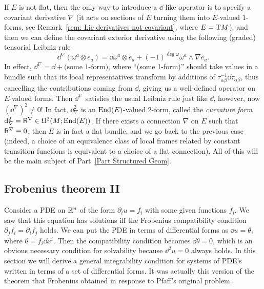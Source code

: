 \begin{rem}
    If $E$ is not flat, then the only way to introduce a $\dd$-like operator is to specify a covariant derivative $\nabla$ (it acts on sections of $E$ turning them into $E$-valued $1$-forms, see Remark~\ref{rem: Lie derivatives not covariant}, where $E=\mathrm{T} M$), and then we can define the covariant exterior derivative using the following (graded) tensorial Leibniz rule
    \[\dd^\nabla(\omega^a\otimes e_a)=\dd\omega^a\otimes e_a+(-1)^{\deg \omega}\omega^a\wedge\nabla e_a.\]
    In effect, $\dd^\nabla=\dd +\text{(some 1-form)}$, where ``(some 1-form)'' should take values in a bundle such that its local representatives transform by additions of $\tau_{\alpha\beta}^{-1}\dd\tau_{\alpha\beta}$, thus cancelling the contributions coming from $\dd$, giving us a well-defined operator on $E$-valued forms.
    Then $\dd^\nabla$ satisfies the usual Leibniz rule just like $\dd$, however, now $(\dd^\nabla)^2\neq 0$! In fact, $\dd_\nabla^2$ is an $\operatorname{End}(E)$-valued $2$-form, called the \emph{curvature form} ${\mathrm{d}}_\nabla^2=\mathsf{R}^\nabla\in\Omega^2(M;\operatorname{End}(E))$. If there exists a connection $\nabla$ on $E$ such that $\mathsf{R}^\nabla\equiv 0$, then $E$ is in fact a flat bundle, and we go back to the previous case (indeed, a choice of an equivalence class of local frames related by constant transition functions is equivalent to a choice of a flat connection). All of this will be the main subject of Part~\ref{Part Structured Geom}.
\end{rem}

\subsection{Frobenius theorem II}\label{sec: frobenius ii}


Consider a PDE on $\mathbb{R}^n$ of the form $\partial_i u=f_i$ with some given functions $f_i$. We saw that this equation has solutions iff the Frobenius compatibility condition $\partial_jf_i=\partial_i f_j$ holds. We can put the PDE in terms of differential forms as $\dd u=\theta$, where $\theta=f_i\dd x^i$. Then the compatibility condition becomes $\dd \theta=0$, which is an obvious necessary condition for solvability because $\dd ^2 u=0$ always holds. In this section we will derive a general integrability condition for systems of PDE's written in terms of a set of differential forms. It was actually this version of the theorem that Frobenius obtained in response to Pfaff's original problem.

